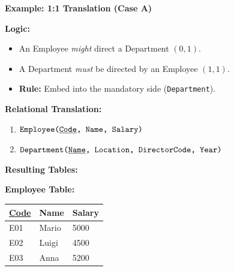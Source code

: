 \vspace{0.2cm}
\begin{example}{\textbf{Example: 1:1 Translation (Case A)}}

\textbf{Logic:}
\begin{itemize}
    \item An Employee \textit{might} direct a Department $(0,1)$.
    \item A Department \textit{must} be directed by an Employee $(1,1)$.
    \item \textbf{Rule:} Embed into the mandatory side (\texttt{Department}).
\end{itemize}

\vs

\begin{center}
\end{center}

\textbf{Relational Translation:}
\begin{enumerate}
    \item $\texttt{Employee(\underline{Code}, Name, Salary)}$
    \item $\texttt{Department(\underline{Name}, Location, DirectorCode, Year)}$
\end{enumerate}

\vs
\textbf{Resulting Tables:}

\vs

\textbf{Employee Table:}

\vs
\begin{center}
\begin{tabular}{|l|l|l|}
\hline
\textbf{\underline{Code}} & \textbf{Name} & \textbf{Salary} \\
\hline
E01 & Mario & 5000 \\
E02 & Luigi & 4500 \\
E03 & Anna  & 5200 \\
\hline
\end{tabular}
\end{center}


\end{example}
